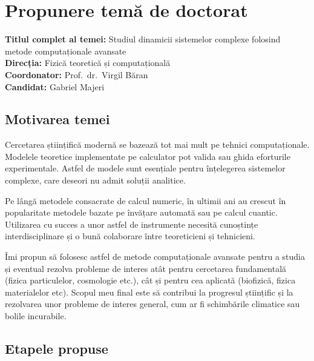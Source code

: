 
\section*{Propunere temă de doctorat}

\textbf{Titlul complet al temei:} Studiul dinamicii sistemelor complexe folosind metode computaționale avansate \\[0.5em]
\textbf{Direcția:} Fizică teoretică și computațională \\[0.5em]
\textbf{Coordonator:} Prof.~dr.~Virgil Băran \\[0.5em]
\textbf{Candidat:} Gabriel Majeri

\subsection*{Motivarea temei}

Cercetarea științifică modernă se bazează tot mai mult pe tehnici computaționale. Modelele teoretice implementate pe calculator pot valida sau ghida eforturile experimentale. Astfel de modele sunt esențiale pentru înțelegerea sistemelor complexe, care deseori nu admit soluții analitice.

Pe lângă metodele consacrate de calcul numeric, în ultimii ani au crescut în popularitate metodele bazate pe învățare automată sau pe calcul cuantic. Utilizarea cu succes a unor astfel de instrumente necesită cunoștințe interdisciplinare și o bună colaborare între teoreticieni și tehnicieni.

Îmi propun să folosesc astfel de metode computaționale avansate pentru a studia și eventual rezolva probleme de interes atât pentru cercetarea fundamentală (fizica particulelor, cosmologie etc.), cât și pentru cea aplicată (biofizică, fizica materialelor etc). Scopul meu final este să contribui la progresul științific și la rezolvarea unor probleme de interes general, cum ar fi schimbările climatice sau bolile incurabile.

\subsection*{Etapele propuse}

